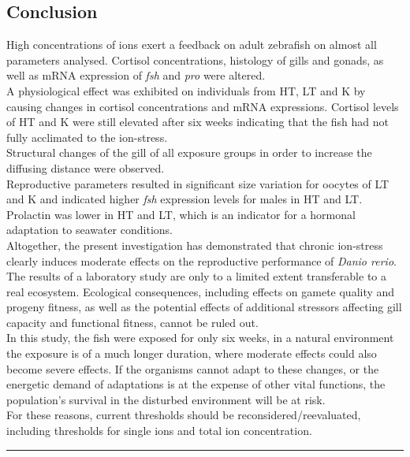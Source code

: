 \documentclass[twoside]{article}
\begin{document}
\begin{multicols}{2}
\section*{Conclusion}
High concentrations of ions exert a feedback on adult zebrafish on almost all parameters analysed. Cortisol concentrations, histology of gills and gonads, as well as mRNA expression of \textit{fsh} and \textit{pro} were altered. \\
A physiological effect was exhibited on individuals from HT, LT and K by causing changes in cortisol concentrations and mRNA expressions. Cortisol levels of HT and K were still elevated after six weeks indicating that the fish had not fully acclimated to the ion-stress. \\ 
Structural changes of the gill of all exposure groups in order to increase the diffusing distance were observed.  \\ Reproductive parameters resulted in significant size variation for oocytes of LT and K and indicated higher \textit{fsh} expression levels for males in HT and LT. \\
Prolactin was lower in HT and LT, which is an indicator for a hormonal adaptation to seawater conditions.  \\
Altogether, the present investigation has demonstrated that chronic ion-stress clearly induces moderate effects on the reproductive performance of \textit{Danio rerio}. \\
The results of a laboratory study are only to a limited extent transferable to a real ecosystem. Ecological consequences, including effects on gamete quality and progeny fitness, as well as the potential effects of additional stressors affecting gill capacity and functional fitness, cannot be ruled out. \\
In this study, the fish were exposed for only six weeks, in a natural environment the exposure is of a much longer duration, where moderate effects could also become severe effects. If the organisms cannot adapt to these changes, or the energetic demand of adaptations is at the expense of other vital functions, the population's survival in the disturbed environment will be at risk. \\ 
For these reasons, current thresholds should be reconsidered/reevaluated, including thresholds for single ions and total ion concentration.  








\end{multicols}

\begin{multicols}{2}






\end{multicols}

\noindent\rule{\textwidth}{0.5pt}



\end{document}
